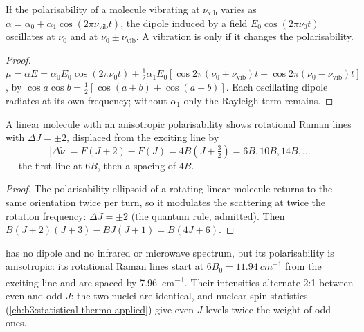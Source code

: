 \begin{proposition}\label{prop:b3:rovibrational-spectroscopy:raman-classical}
If the polarisability of a molecule vibrating at $\nu_{\mathrm{vib}}$ varies
as $\alpha = \alpha_0 + \alpha_1\cos(2\pi\nu_{\mathrm{vib}}t)$, the dipole induced by a
field $E_0\cos(2\pi\nu_0t)$ oscillates at $\nu_0$ and at $\nu_0 \pm \nu_{\mathrm{vib}}$.
A vibration is  only if it changes the polarisability.
\end{proposition}

\begin{proof}
$\mu = \alpha E = \alpha_0E_0\cos(2\pi\nu_0t) + \frac12\alpha_1E_0[\cos2\pi(\nu_0 +
\nu_{\mathrm{vib}})t + \cos2\pi(\nu_0 - \nu_{\mathrm{vib}})t]$, by $\cos a\cos b =
\frac12[\cos(a+b) + \cos(a-b)]$. Each oscillating dipole radiates at its own
frequency; without $\alpha_1$ only the Rayleigh term remains.
\end{proof}

\begin{proposition}\label{prop:b3:rovibrational-spectroscopy:rotational-raman}
A linear molecule with an anisotropic polarisability shows rotational Raman
lines with $\Delta J = \pm2$, displaced from the exciting line by
\[
|\Delta\tilde\nu| = F(J+2) - F(J) = 4B(J + \tfrac32) = 6B, 10B, 14B, \dots
\]
--- the first line at $6B$, then a spacing of $4B$.
\end{proposition}

\begin{proof}
The polarisability ellipsoid of a rotating linear molecule returns to the
same orientation twice per turn, so it modulates the scattering at twice
the rotation frequency: $\Delta J = \pm2$ (the quantum rule, admitted). Then
$B(J+2)(J+3) - BJ(J+1) = B(4J + 6)$.
\end{proof}

\begin{example}\label{ex:b3:rovibrational-spectroscopy:n2}
 has no dipole and no infrared or microwave spectrum, but its
polarisability is anisotropic: its rotational Raman lines start at $6B_0 =
\qty{11.94}{cm^{-1}}$ from the exciting line and are spaced by \qty{7.96}{cm^{-1}}. Their
intensities alternate 2:1 between even and odd $J$: the two  nuclei are
identical, and nuclear-spin statistics (\cref{ch:b3:statistical-thermo-applied})
give even-$J$ levels twice the weight of odd ones.
\end{example}

